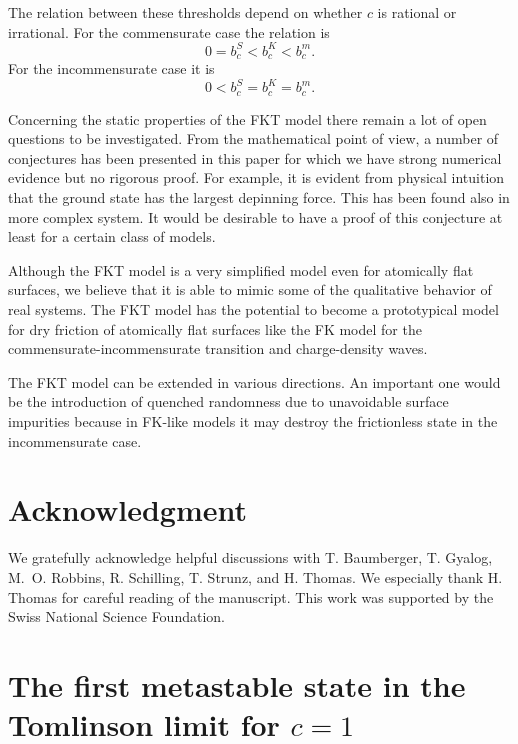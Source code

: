 The relation between these thresholds depend on whether $c$ is
rational or irrational. For the commensurate case the relation is
\begin{equation}
  0=b_c^S<b_c^K<b_c^m.
  \label{CON.bc.c}
\end{equation}
For the incommensurate case it is
\begin{equation}
  0<b_c^S=b_c^K=b_c^m.
  \label{CON.bc.ic}
\end{equation}

Concerning the static properties of the FKT model there remain a lot
of open questions to be investigated. From the mathematical point of
view, a number of conjectures has been presented in this paper for
which we have strong numerical evidence but no rigorous proof. For
example, it is evident from physical intuition that the ground state
has the largest depinning force. This has been found also in more
complex system\cite{rob.95}. It would be desirable to have a proof of
this conjecture at least for a certain class of models.

Although the FKT model is a very simplified model even for atomically
flat surfaces, we believe that it is able to mimic some of the
qualitative behavior of real systems. The FKT model has the potential
to become a prototypical model for dry friction of atomically flat
surfaces like the FK model for the commensurate-incommensurate
transition and charge-density waves.

The FKT model can be extended in various directions. An important one
would be the introduction of quenched randomness due to unavoidable
surface impurities because in FK-like models it may destroy the 
frictionless state in the incommensurate case\cite{mat.94}.

\section*{Acknowledgment}

We gratefully acknowledge helpful discussions with T. Baumberger, T.
Gyalog, M.~O. Robbins, R. Schilling, T. Strunz, and H. Thomas. 
We especially thank H. Thomas for careful reading of the manuscript. 
This work was supported by the Swiss National Science Foundation.

\appendix

\section{\label{AP1}The first metastable state in the Tomlinson limit
    for \protect\lowercase{{$c=1$}}}

